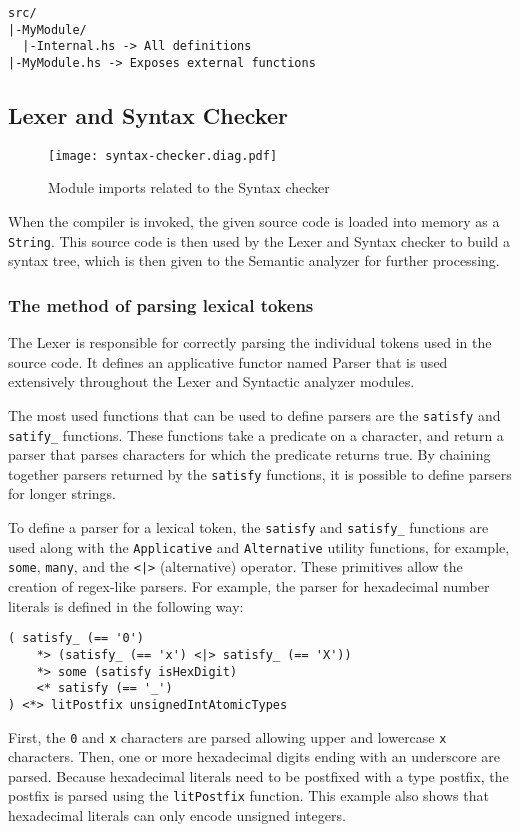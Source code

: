 \documentclass[12pt]{article}
\begin{document}
\lstset{numbers=none}
\begin{lstlisting}
src/
|-MyModule/
  |-Internal.hs -> All definitions
|-MyModule.hs -> Exposes external functions
\end{lstlisting}

\subsection{Lexer and Syntax Checker}

\begin{figure}[t]
\texttt{[image: syntax-checker.diag.pdf]}
\centering
\caption{Module imports related to the Syntax checker}
\end{figure}

When the compiler is invoked, the given source code is loaded into memory as a
\verb$String$. This source code is then used by the Lexer and
Syntax checker to build a syntax tree, which is then given to the
Semantic analyzer for further processing.

\subsubsection{The method of parsing lexical tokens}

The Lexer is responsible for correctly parsing the individual tokens used in the
source code. It defines an applicative functor named Parser that is used
extensively throughout the Lexer and Syntactic analyzer modules. 

The most used functions that can be used to define parsers are the
\verb$satisfy$ and \verb$satify_$ functions. These functions take a predicate on
a character, and return a parser that parses characters for which the predicate
returns true. By chaining together parsers returned by the \verb$satisfy$
functions, it is possible to define parsers for longer strings.

To define a parser for a lexical token, the \verb$satisfy$ and \verb$satisfy_$
functions are used along with the \verb$Applicative$ and \verb$Alternative$
utility functions, for example, \verb$some$, \verb$many$, and the \verb$<|>$
(alternative) operator. These primitives allow the creation of regex-like
parsers. For example, the parser for hexadecimal number literals is defined in
the following way:
\\\noindent\begin{minipage}{\textwidth}
\begin{lstlisting}
( satisfy_ (== '0')
    *> (satisfy_ (== 'x') <|> satisfy_ (== 'X'))
    *> some (satisfy isHexDigit)
    <* satisfy (== '_')
) <*> litPostfix unsignedIntAtomicTypes
\end{lstlisting}
\end{minipage}
First, the \verb$0$ and \verb$x$ characters are parsed allowing upper and
lowercase \verb$x$ characters. Then, one or more hexadecimal digits ending with
an underscore are parsed. Because hexadecimal literals need to be postfixed with
a type postfix, the postfix is parsed using the \verb$litPostfix$ function. This
example also shows that hexadecimal literals can only encode unsigned integers.
\end{document}
